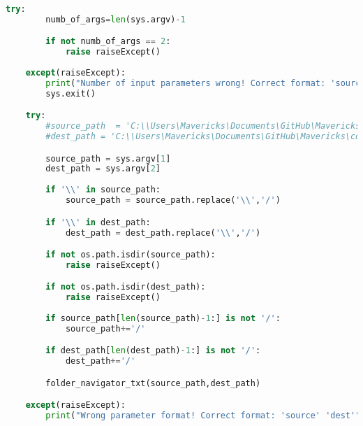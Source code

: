 \begin{lstlisting}[language=Python, flexiblecolumns=true, caption=txtFileMaker code.]
    try: 
        numb_of_args=len(sys.argv)-1

        if not numb_of_args == 2: 
            raise raiseExcept()
            
    except(raiseExcept):
        print("Number of input parameters wrong! Correct format: 'source' 'dest'")
        sys.exit()

    try: 
        #source_path  = 'C:\\Users\Mavericks\Documents\GitHub\Mavericks\coding\PyTests\FolderNavTest\Testing_folder'           //these two could be used instead of sys.argv[1] and sys.argv[2]
        #dest_path = 'C:\\Users\Mavericks\Documents\GitHub\Mavericks\coding\PyTests\FolderNavTest\Results_folder'              // in order to run the code in an IDE or similar 

        source_path = sys.argv[1]
        dest_path = sys.argv[2]
        
        if '\\' in source_path:
            source_path = source_path.replace('\\','/')

        if '\\' in dest_path:
            dest_path = dest_path.replace('\\','/')

        if not os.path.isdir(source_path):
            raise raiseExcept()

        if not os.path.isdir(dest_path):
            raise raiseExcept()
        
        if source_path[len(source_path)-1:] is not '/':
            source_path+='/'

        if dest_path[len(dest_path)-1:] is not '/':
            dest_path+='/'

        folder_navigator_txt(source_path,dest_path)

    except(raiseExcept): 
        print("Wrong parameter format! Correct format: 'source' 'dest'")
\end{lstlisting}








